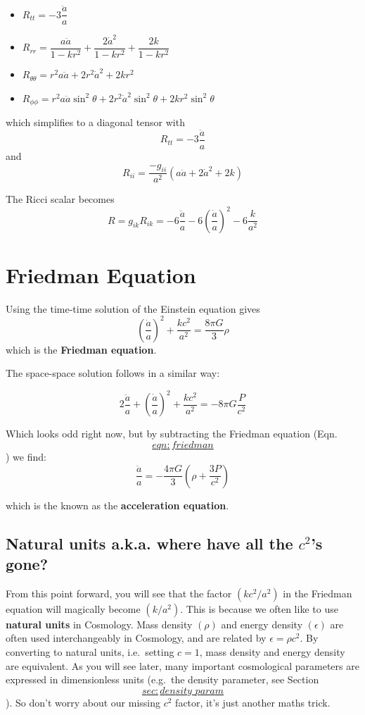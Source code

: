 \documentclass[]{book}
\begin{document}
\begin{itemize}
\item
  \(R_{tt} = -3\dfrac{\ddot{a}}{a}\)
\item
  \(R_{rr} = \dfrac{a\ddot{a}}{1 - kr^2} + \dfrac{2\dot{a}^2}{1 - kr^2} + \dfrac{2k}{1-kr^2}\)
\item
  \(R_{\theta\theta} = r^2a\ddot{a} + 2r^2\dot{a}^2 + 2kr^2\)
\item
  \(R_{\phi\phi} = r^2 a\ddot{a}\sin^2\theta + 2r^2\dot{a}^2\sin^2\theta + 2kr^2 \sin^2\theta\)
\end{itemize}

which simplifies to a diagonal tensor with
\[R_{tt}= -3\dfrac{\ddot{a}}{a}\] and
\[R_{ii} = \dfrac{-g_{ii}}{a^2}\left(a\ddot{a} + 2\dot{a}^2 + 2k\right)\]

The Ricci scalar becomes
\[R = g_{ik}R_{ik} = - 6\dfrac{\ddot{a}}{a} - 6\left(\dfrac{\dot{a}}{a}\right)^2 - 6\dfrac{k}{a^2}\]

\section{Friedman Equation}\label{sec:friedman}

Using the time-time solution of the Einstein equation gives
\[\label{eqn:friedman}
    \left(\dfrac{\dot{a}}{a}\right)^2 + \dfrac{kc^2}{a^2} = \dfrac{8\pi G}{3}\rho\]which
is the \textbf{Friedman equation}.

The space-space solution follows in a similar way:

\[2\dfrac{\ddot{a}}{a} + \left(\dfrac{\dot{a}}{a}\right)^2 + \dfrac{kc^2}{a^2} = -8\pi G \dfrac{P}{c^2}\]

Which looks odd right now, but by subtracting the Friedman equation
(Eqn.~\protect\hyperlink{eqn:friedman}{\[eqn:friedman\]}) we find:
\[\label{eqn:acceleration}
    \dfrac{\ddot{a}}{a} = -\dfrac{4\pi G}{3}\left(\rho + \dfrac{3P}{c^2}\right)\]

which is the known as the \textbf{acceleration equation}.

\subsection{\texorpdfstring{Natural units a.k.a. where have all the
\(c^2\)'s
gone?}{Natural units a.k.a. where have all the c\^{}2's gone?}}\label{sec:natural_units}

From this point forward, you will see that the factor
\(\left(k c^2/a^2\right)\) in the Friedman equation will magically
become \(\left(k/a^2\right)\). This is because we often like to use
\textbf{natural units} in Cosmology. Mass density \(\left(\rho\right)\)
and energy density \(\left(\epsilon\right)\) are often used
interchangeably in Cosmology, and are related by
\(\epsilon = \rho c^2\). By converting to natural units, i.e.~setting
\(c=1\), mass density and energy density are equivalent. As you will see
later, many important cosmological parameters are expressed in
dimensionless units (e.g.~the density parameter, see
Section~\protect\hyperlink{sec:density_param}{\[sec:density\_param\]}).
So don't worry about our missing \(c^2\) factor, it's just another maths
trick.
\end{document}
